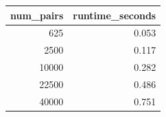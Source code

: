 \begin{tabular}{rr}
\toprule
num\_pairs & runtime\_seconds \\
\midrule
625 & 0.053 \\
2500 & 0.117 \\
10000 & 0.282 \\
22500 & 0.486 \\
40000 & 0.751 \\
\bottomrule
\end{tabular}
